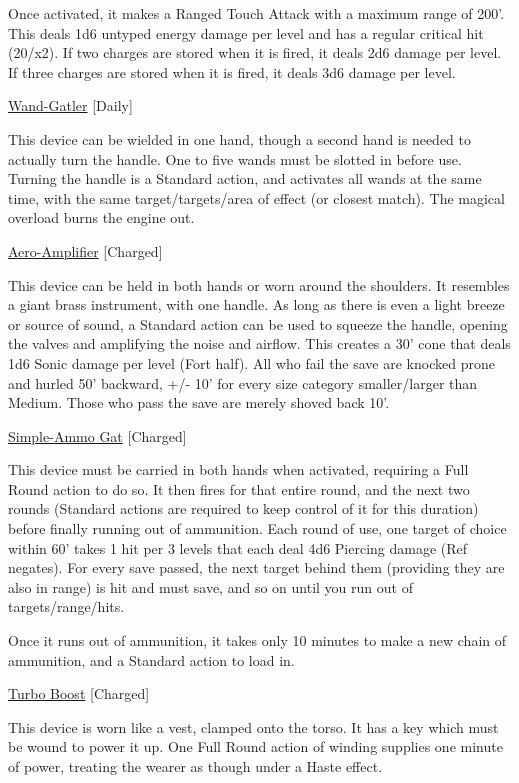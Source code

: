 \smallskip\noindent Once activated, it makes a Ranged Touch Attack with a maximum range of 200'. This deals 1d6 untyped energy damage per level and has a regular critical hit (20/x2). If two charges are stored when it is fired, it deals 2d6 damage per level. If three charges are stored when it is fired, it deals 3d6 damage per level.

\medskip\noindent\underline{Wand-Gatler} [Daily]

\noindent This device can be wielded in one hand, though a second hand is needed to actually turn the handle. One to five wands must be slotted in before use. Turning the handle is a Standard action, and activates all wands at the same time, with the same target/targets/area of effect (or closest match). The magical overload burns the engine out.

\medskip\noindent\underline{Aero-Amplifier} [Charged]

\noindent This device can be held in both hands or worn around the shoulders. It resembles a giant brass instrument, with one handle. As long as there is even a light breeze or source of sound, a Standard action can be used to squeeze the handle, opening the valves and amplifying the noise and airflow. This creates a 30' cone that deals 1d6 Sonic damage per level (Fort half). All who fail the save are knocked prone and hurled 50' backward, +/- 10' for every size category smaller/larger than Medium. Those who pass the save are merely shoved back 10'.

\medskip\noindent\underline{Simple-Ammo Gat} [Charged]

\noindent This device must be carried in both hands when activated, requiring a Full Round action to do so. It then fires for that entire round, and the next two rounds (Standard actions are required to keep control of it for this duration) before finally running out of ammunition. Each round of use, one target of choice within 60' takes 1 hit per 3 levels that each deal 4d6 Piercing damage (Ref negates). For every save passed, the next target behind them (providing they are also in range) is hit and must save, and so on until you run out of targets/range/hits.

\smallskip\noindent Once it runs out of ammunition, it takes only 10 minutes to make a new chain of ammunition, and a Standard action to load in.

\medskip\noindent\underline{Turbo Boost} [Charged]

\noindent This device is worn like a vest, clamped onto the torso. It has a key which must be wound to power it up. One Full Round action of winding supplies one minute of power, treating the wearer as though under a Haste effect.


